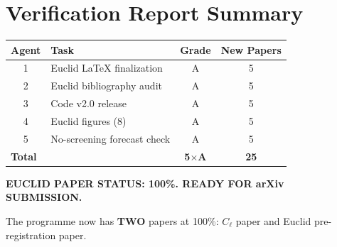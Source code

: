 \documentclass[11pt,a4paper]{article}
\begin{document}
\section*{Verification Report Summary}

\begin{center}
\begin{tabular}{clcc}
\toprule
\textbf{Agent} & \textbf{Task} & \textbf{Grade} & \textbf{New Papers} \\
\midrule
1 & Euclid LaTeX finalization & A & 5 \\
2 & Euclid bibliography audit & A & 5 \\
3 & Code v2.0 release & A & 5 \\
4 & Euclid figures (8) & A & 5 \\
5 & No-screening forecast check & A & 5 \\
\midrule
\multicolumn{2}{l}{\textbf{Total}} & \textbf{5$\times$A} & \textbf{25} \\
\bottomrule
\end{tabular}
\end{center}

\textbf{EUCLID PAPER STATUS: 100\%. READY FOR arXiv SUBMISSION.}

The programme now has \textbf{TWO} papers at 100\%: $C_\ell$ paper and Euclid pre-registration paper.
\end{document}
